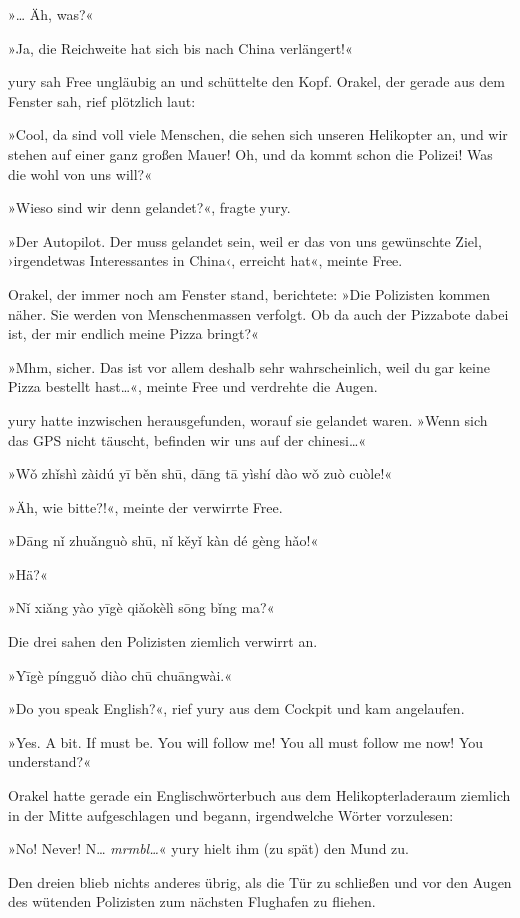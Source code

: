 »… Äh, was?«

»Ja, die Reichweite hat sich bis nach China verlängert!«

yury sah Free ungläubig an und schüttelte den Kopf. Orakel, der gerade aus dem Fenster sah, rief plötzlich laut:

»Cool, da sind voll viele Menschen, die sehen sich unseren Helikopter an, und wir stehen auf einer ganz großen Mauer! Oh, und da kommt schon die Polizei! Was die wohl von uns will?«

»Wieso sind wir denn gelandet?«, fragte yury.

»Der Autopilot. Der muss gelandet sein, weil er das von uns gewünschte Ziel, ›irgendetwas Interessantes in China‹, erreicht hat«, meinte Free.

Orakel, der immer noch am Fenster stand, berichtete: »Die Polizisten kommen näher. Sie werden von Menschenmassen verfolgt. Ob da auch der Pizzabote dabei ist, der mir endlich meine Pizza bringt?«

»Mhm, sicher. Das ist vor allem deshalb sehr wahrscheinlich, weil du gar keine Pizza bestellt hast…«, meinte Free und verdrehte die Augen.

yury hatte inzwischen herausgefunden, worauf sie gelandet waren. »Wenn sich das GPS nicht täuscht, befinden wir uns auf der chinesi…«

»Wǒ zhǐshì zàidú yī běn shū, dāng tā yìshí dào wǒ zuò cuòle!«

»Äh, wie bitte?!«, meinte der verwirrte Free.

»Dāng nǐ zhuǎnguò shū, nǐ kěyǐ kàn dé gèng hǎo!«

»Hä?«

»Nǐ xiǎng yào yīgè qiǎokèlì sōng bǐng ma?«

Die drei sahen den Polizisten ziemlich verwirrt an.

»Yīgè píngguǒ diào chū chuāngwài.«

»Do you speak English?«, rief yury aus dem Cockpit und kam angelaufen.

»Yes. A bit. If must be. You will follow me! You all must follow me now! You understand?«

Orakel hatte gerade ein Englischwörterbuch aus dem Helikopterladeraum ziemlich in der Mitte aufgeschlagen und begann, irgendwelche Wörter vorzulesen:

»No! Never! N… \textit{mrmbl…}« yury hielt ihm (zu spät) den Mund zu.

Den dreien blieb nichts anderes übrig, als die Tür zu schließen und vor den Augen des wütenden Polizisten zum nächsten Flughafen zu fliehen.

